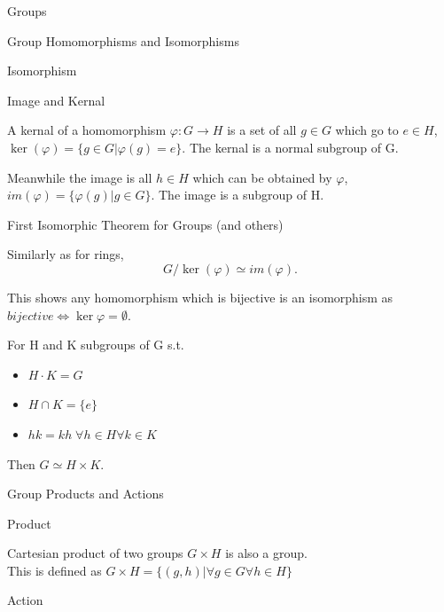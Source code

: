 \documentclass[12pt, letterpaper]{article}
\begin{document}
\begin{section}{Groups}
\begin{subsection}{Group Homomorphisms and Isomorphisms}
\begin{subsubsection}{Isomorphism}
    \end{subsubsection}

    \begin{subsubsection}{Image and Kernal}

      A kernal of a homomorphism \(\varphi : G \to H\) is a set of all \(g \in G\)
      which go to \(e \in H\), \(\ker(\varphi) = \{ g \in G | \varphi(g) = e \}\).
      The kernal is a normal subgroup of G.

      Meanwhile the image is all \(h \in H\) which can be obtained by \(\varphi\),
      \(im(\varphi) = \{ \varphi(g) | g \in G \}\).
      The image is a subgroup of H.

    \end{subsubsection}

    \begin{subsubsection}{First Isomorphic Theorem for Groups (and others)}

      Similarly as for rings, \[G / \ker(\varphi) \simeq im(\varphi).\]

      This shows any homomorphism which is bijective is an isomorphism as
      \(bijective \iff \ker{\varphi} = \emptyset\).

      For H and K subgroups of G s.t.
      \begin{itemize}
        \item \(H \cdot K = G\)
        \item \(H \cap K = \{ e \}\)
        \item \(hk = kh \; \forall h \in H \forall k \in K\)
      \end{itemize}
      Then \(G \simeq H \times K\).

    \end{subsubsection}

  \end{subsection}

  \begin{subsection}{Group Products and Actions}

    \begin{subsubsection}{Product}

      Cartesian product of two groups \(G \times H\) is also a group. \\
      This is defined as \(G \times H = \{ (g, h) | \forall g \in G \forall h \in H \}\)

    \end{subsubsection}

    \begin{subsubsection}{Action}


\end{subsubsection}
\end{subsection}
\end{section}
\end{document}
